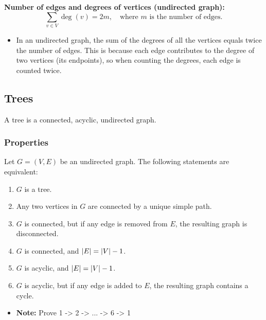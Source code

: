 \begin{example}
        \textbf{Number of edges and degrees of vertices (undirected graph):}
        \[
        \sum_{v \in V} \deg(v) = 2m, \quad \text{where } m \text{ is the number of edges.}
        \]
        \begin{itemize}
            \item In an undirected graph, the sum of the degrees of all the vertices equals twice the number of edges. This is because each edge contributes to the degree of two vertices (its endpoints), so when counting the degrees, each edge is counted twice.
        \end{itemize}
    \end{example}

\subsection{Trees}
    \begin{definition}
        A tree is a connected, acyclic, undirected graph. 
    \end{definition}

    \subsubsection{Properties}
    \begin{definition}
        Let $G=(V,E)$ be an undirected graph. The following statements are equivalent:
        \begin{enumerate}
            \item $G$ is a tree. 
            \item Any two vertices in $G$ are connected by a unique simple path. 
            \item $G$ is connected, but if any edge is removed from $E$, the resulting graph is disconnected. 
            \item $G$ is connected, and $\abs{E} = \abs{V} - 1$.
            \item $G$ is acyclic, and $\abs{E} = \abs{V} - 1$.
            \item $G$ is acyclic, but if any edge is added to $E$, the resulting graph contains a cycle.
        \end{enumerate}
        \begin{itemize}
            \item \textbf{Note:} Prove 1 -> 2 -> ... -> 6 -> 1
        \end{itemize}
    \end{definition}


